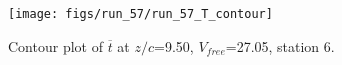 \begin{figure}[H]
\centering
\texttt{[image: figs/run\_57/run\_57\_T\_contour]}
\caption{Contour plot of $\overline{t}$ at $z/c$=9.50, $V_{free}$=27.05, station 6.}
\end{figure}


